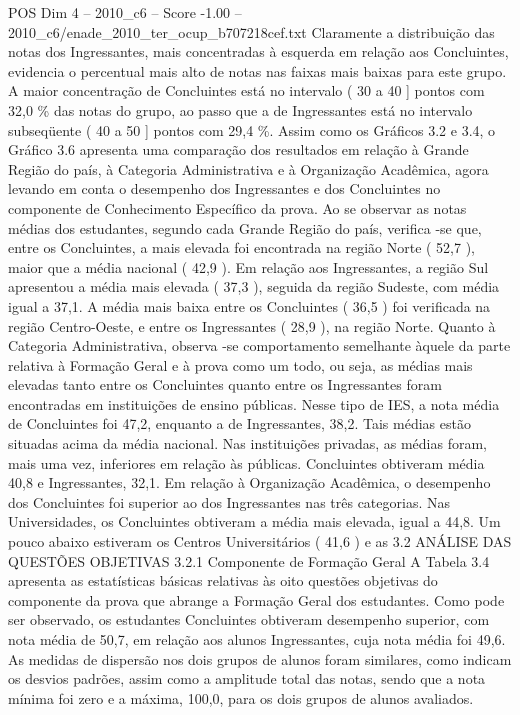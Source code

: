 \begin{textsample}{POS Dim 4 – 2010\_c6 – Score -1.00 – 2010\_c6/enade\_2010\_ter\_ocup\_b707218cef.txt}
Claramente a distribuição das notas dos Ingressantes, mais concentradas à esquerda em relação aos Concluintes, evidencia o percentual mais alto de notas nas faixas mais baixas para este grupo.
A maior concentração de Concluintes está no intervalo ( 30 a 40 ] pontos com 32,0 \% das notas do grupo, ao passo que a de Ingressantes está no intervalo subseqüente ( 40 a 50 ] pontos com 29,4 \%.
Assim como os Gráficos 3.2 e 3.4, o Gráfico 3.6 apresenta uma comparação dos resultados em relação à Grande Região do país, à Categoria Administrativa e à Organização Acadêmica, agora levando em conta o desempenho dos Ingressantes e dos Concluintes no componente de Conhecimento Específico da prova.
Ao se observar as notas médias dos estudantes, segundo cada Grande Região do país, verifica -se que, entre os Concluintes, a mais elevada foi encontrada na região Norte ( 52,7 ), maior que a média nacional ( 42,9 ).
Em relação aos Ingressantes, a região Sul apresentou a média mais elevada ( 37,3 ), seguida da região Sudeste, com média igual a 37,1.
A média mais baixa entre os Concluintes ( 36,5 ) foi verificada na região Centro-Oeste, e entre os Ingressantes ( 28,9 ), na região Norte.
Quanto à Categoria Administrativa, observa -se comportamento semelhante àquele da parte relativa à Formação Geral e à prova como um todo, ou seja, as médias mais elevadas tanto entre os Concluintes quanto entre os Ingressantes foram encontradas em instituições de ensino públicas.
Nesse tipo de IES, a nota média de Concluintes foi 47,2, enquanto a de Ingressantes, 38,2.
Tais médias estão situadas acima da média nacional.
Nas instituições privadas, as médias foram, mais uma vez, inferiores em relação às públicas.
Concluintes obtiveram média 40,8 e Ingressantes, 32,1.
Em relação à Organização Acadêmica, o desempenho dos Concluintes foi superior ao dos Ingressantes nas três categorias.
Nas Universidades, os Concluintes obtiveram a média mais elevada, igual a 44,8.
Um pouco abaixo estiveram os Centros Universitários ( 41,6 ) e as 3.2 ANÁLISE DAS QUESTÕES OBJETIVAS 3.2.1 Componente de Formação Geral A Tabela 3.4 apresenta as estatísticas básicas relativas às oito questões objetivas do componente da prova que abrange a Formação Geral dos estudantes.
Como pode ser observado, os estudantes Concluintes obtiveram desempenho superior, com nota média de 50,7, em relação aos alunos Ingressantes, cuja nota média foi 49,6.
As medidas de dispersão nos dois grupos de alunos foram similares, como indicam os desvios padrões, assim como a amplitude total das notas, sendo que a nota mínima foi zero e a máxima, 100,0, para os dois grupos de alunos avaliados.

\end{textsample}
